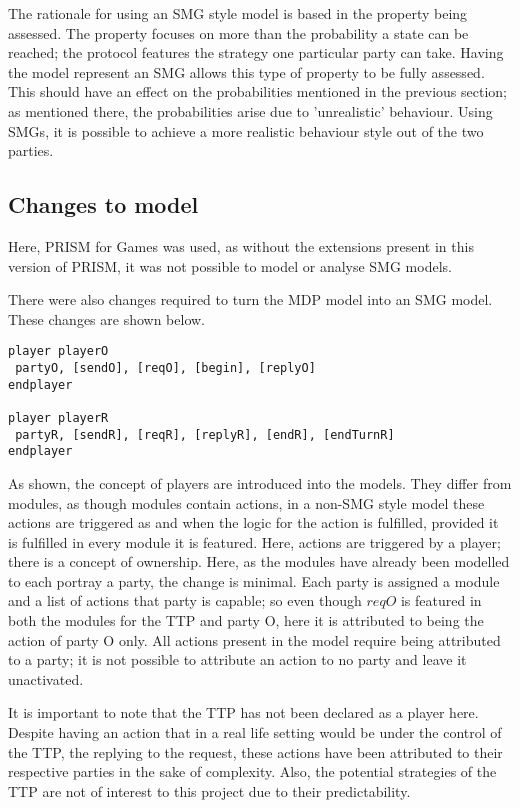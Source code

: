 \documentclass{l4proj}
\begin{document}
The rationale for using an SMG style model is based in the property being assessed. The property focuses on more than the probability a state can be reached; the protocol features the strategy one particular party can take. Having the model represent an SMG allows this type of property to be fully assessed.
This should have an effect on the probabilities mentioned in the previous section; as mentioned there, the probabilities arise due to 'unrealistic' behaviour. Using SMGs, it is possible to achieve a more realistic behaviour style out of the two parties.

\subsection{Changes to model}

Here, PRISM for Games was used, as without the extensions present in this version of PRISM, it was not possible to model or analyse SMG models.

There were also changes required to turn the MDP model into an SMG model. These changes are shown below.
\begin{lstlisting}
player playerO
 partyO, [sendO], [reqO], [begin], [replyO]
endplayer

player playerR
 partyR, [sendR], [reqR], [replyR], [endR], [endTurnR]
endplayer
\end{lstlisting}

As shown, the concept of players are introduced into the models. They differ from modules, as though modules contain actions, in a non-SMG style model these actions are triggered as and when the logic for the action is fulfilled, provided it is fulfilled in every module it is featured. Here, actions are triggered by a player; there is a concept of ownership. Here, as the modules have already been modelled to each portray a party, the change is minimal. Each party is assigned a module and a list of actions that party is capable; so even though $reqO$ is featured in both the modules for the TTP and party O, here it is attributed to being the action of party O only. All actions present in the model require being attributed to a party; it is not possible to attribute an action to no party and leave it unactivated.

It is important to note that the TTP has not been declared as a player here. Despite having an action that in a real life setting would be under the control of the TTP, the replying to the request, these actions have been attributed to their respective parties in the sake of complexity. Also, the potential strategies of the TTP are not of interest to this project due to their predictability.
\end{document}
